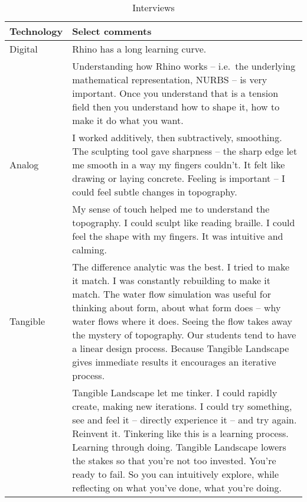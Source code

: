 \begin{table*}
\caption{Interviews}
\begin{tabular}{p{} p{ }}
\toprule
Technology & Select comments\\
\midrule
%
Digital
%
& Rhino has a long learning curve.\\
& Understanding how Rhino works 
-- i.e.~the underlying mathematical representation, NURBS -- is very important. 
Once you understand that is a tension field 
then you understand how to shape it, how to make it do what you want.\\
%
Analog 
%
& I worked additively, then subtractively, smoothing.
The sculpting tool gave sharpness --
the sharp edge let me smooth in a way my fingers couldn't.
It felt like drawing or laying concrete.
Feeling is important -- I could feel subtle changes in topography.\\
& My sense of touch helped me to understand the topography.
I could sculpt like reading braille. I could feel the shape with my fingers.
It was intuitive and calming.\\
%
Tangible
% 
& The difference analytic was the best. 
I tried to make it match. 
I was constantly rebuilding to make it match.
The water flow simulation was useful for thinking about form, 
about what form does --  why water flows where it does.
Seeing the flow takes away the mystery of topography.
Our students tend to have a linear design process.
Because Tangible Landscape gives immediate results 
it encourages an iterative process. \\
& Tangible Landscape let me tinker. 
I could rapidly create, making new iterations. 
I could try something, see and feel it -- directly experience it --
and try again. Reinvent it.
Tinkering like this is a learning process. Learning through doing.
Tangible Landscape lowers the stakes so that you're not too invested.
You're ready to fail. So you can intuitively explore, 
while reflecting on what you've done,
what you're doing.\\
%
\bottomrule
\end{tabular}
\label{table:interviews}
\end{table*}